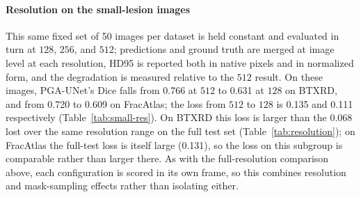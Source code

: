 \paragraph{Resolution on the small-lesion images}
This same fixed set of 50 images per dataset is held constant and evaluated in turn at $128$, $256$, and $512$; predictions and ground truth are merged at image level at each resolution, HD95 is reported both in native pixels and in normalized form, and the degradation is measured relative to the $512$ result. On these images, PGA-UNet's Dice falls from 0.766 at $512$ to 0.631 at $128$ on BTXRD, and from 0.720 to 0.609 on FracAtlas; the loss from $512$ to $128$ is 0.135 and 0.111 respectively (Table~\ref{tab:small-res}). On BTXRD this loss is larger than the 0.068 lost over the same resolution range on the full test set (Table~\ref{tab:resolution}); on FracAtlas the full-test loss is itself large (0.131), so the loss on this subgroup is comparable rather than larger there. As with the full-resolution comparison above, each configuration is scored in its own frame, so this combines resolution and mask-sampling effects rather than isolating either.

\begin{table}[t]
\caption{PGA-UNet on the fixed 50-image lower-lesion-area image subset of each dataset across resolutions. Dice, IoU, and CBL are reported as covering / off-center; each configuration is scored in its own frame. The HD95 pair denotes native pixels / normalized distance under the covering condition. The Delta Dice column is the covering-prompt difference relative to the $512$ configuration.}
\label{tab:small-res}
\centering
\scriptsize
{}
\end{table}

